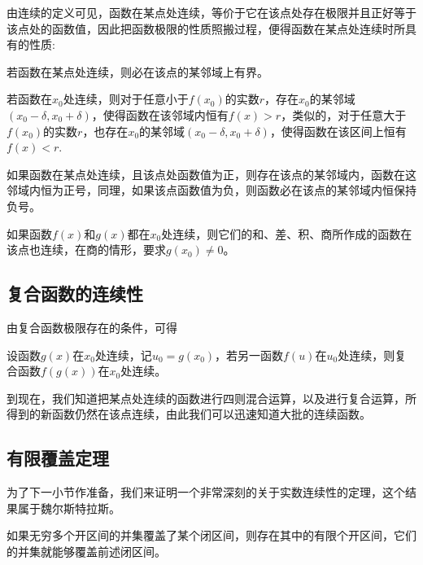 由连续的定义可见，函数在某点处连续，等价于它在该点处存在极限并且正好等于该点处的函数值，因此把函数极限的性质照搬过程，便得函数在某点处连续时所具有的性质:
\begin{theorem}[局部有界性]
  若函数在某点处连续，则必在该点的某邻域上有界。
\end{theorem}

\begin{theorem}[局部保号性]
  若函数在$x_0$处连续，则对于任意小于$f(x_0)$的实数$r$，存在$x_0$的某邻域$(x_0-\delta,x_0+\delta)$，使得函数在该邻域内恒有$f(x)>r$，类似的，对于任意大于$f(x_0)$的实数$r$，也存在$x_0$的某邻域$(x_0-\delta,x_0+\delta)$，使得函数在该区间上恒有$f(x)<r$.
\end{theorem}

\begin{inference}
  如果函数在某点处连续，且该点处函数值为正，则存在该点的某邻域内，函数在这邻域内恒为正号，同理，如果该点函数值为负，则函数必在该点的某邻域内恒保持负号。
\end{inference}

\begin{theorem}
  如果函数$f(x)$和$g(x)$都在$x_0$处连续，则它们的和、差、积、商所作成的函数在该点也连续，在商的情形，要求$g(x_0) \neq 0$。
\end{theorem}

\subsection{复合函数的连续性}
\label{sec:continuousness-of-composite-function}

由复合函数极限存在的条件，可得
\begin{theorem}[复合函数的连续性]
  \label{theorem:the-continuity-of-combine-function}
  设函数$g(x)$在$x_0$处连续，记$u_0=g(x_0)$，若另一函数$f(u)$在$u_0$处连续，则复合函数$f(g(x))$在$x_0$处连续。
\end{theorem}

到现在，我们知道把某点处连续的函数进行四则混合运算，以及进行复合运算，所得到的新函数仍然在该点连续，由此我们可以迅速知道大批的连续函数。

\subsection{有限覆盖定理}
\label{sec:finite-covering-theorem}

为了下一小节作准备，我们来证明一个非常深刻的关于实数连续性的定理，这个结果属于魏尔斯特拉斯。

\begin{theorem}[魏尔斯特拉斯有限覆盖定理]
  如果无穷多个开区间的并集覆盖了某个闭区间，则存在其中的有限个开区间，它们的并集就能够覆盖前述闭区间。
\end{theorem}


